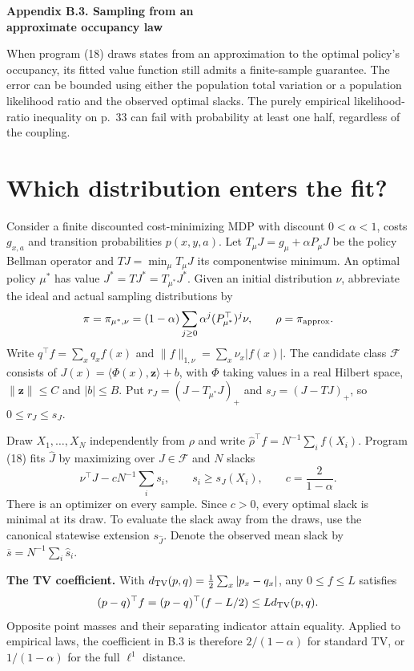 \documentclass[12pt,a4paper]{article}
\newcommand{\cF}{\mathcal F}
\newcommand{\TV}{d_{\rm TV}}
\newcommand{\al}{\alpha}
\newcommand{\app}{\pi_{\rm approx}}
\newcommand{\pistar}{\pi_{\mu^*,\nu}}
\newcommand{\lead}[1]{\par\smallskip\noindent\textbf{#1}\enspace}
\begin{document}
{\LARGE\bfseries Appendix B.3. Sampling from an\\[2pt] approximate occupancy law\par}
\medskip
When program (18) draws states from an approximation to the optimal policy's
occupancy, its fitted value function still admits a finite-sample guarantee.
The error can be bounded using either the population total variation or a
population likelihood ratio and the observed optimal slacks. The purely
empirical likelihood-ratio inequality on p.~33 can fail with probability at
least one half, regardless of the coupling.

\section*{Which distribution enters the fit?}
Consider a finite discounted cost-minimizing MDP with discount
$0<\al<1$, costs $g_{x,a}$ and transition probabilities $p(x,y,a)$. Let
$T_\mu J=g_\mu+\al P_\mu J$ be the policy Bellman operator and
$TJ=\min_\mu T_\mu J$ its componentwise minimum. An optimal policy
$\mu^*$ has value $J^*=TJ^*=T_{\mu^*}J^*$. Given an initial distribution
$\nu$, abbreviate the ideal and actual sampling distributions by
\[
 \pi=\pistar=(1-\al)\sum_{j\ge0}\al^j(P_{\mu^*}^{\top})^j\nu,
 \qquad \rho=\app .
\]
Write $q^\top f=\sum_x q_x f(x)$ and
$\|f\|_{1,\nu}=\sum_x\nu_x|f(x)|$. The candidate class $\cF$ consists of
$J(x)=\langle\Phi(x),\mathbf z\rangle+b$, with $\Phi$ taking values in a
real Hilbert space, $\|\mathbf z\|\le C$ and $|b|\le B$.
Put $r_J=(J-T_{\mu^*}J)_+$ and $s_J=(J-TJ)_+$, so $0\le r_J\le s_J$.

Draw $X_1,\ldots,X_N$ independently from $\rho$ and write
$\widehat\rho^\top f=N^{-1}\sum_i f(X_i)$. Program (18) fits $\widehat J$
by maximizing over $J\in\cF$ and $N$ slacks
\[
 \nu^\top J-cN^{-1}\sum_i s_i,\qquad
 s_i\ge s_J(X_i),\qquad c=\frac{2}{1-\al}.
\]
There is an optimizer on every sample. Since $c>0$, every optimal slack
is minimal at its draw. To evaluate the slack away from the draws, use the
canonical statewise extension $s_{\widehat J}$. Denote the observed mean
slack by $\overline s=N^{-1}\sum_i\widehat s_i$.

\lead{The TV coefficient.}
With $\TV(p,q)=\frac12\sum_x|p_x-q_x|$, any $0\le f\le L$ satisfies
\begin{equation}
 (p-q)^\top f=(p-q)^\top(f-L/2)\le L\TV(p,q).
 \label{eq:tv}
\end{equation}
Opposite point masses and their separating indicator attain equality.
Applied to empirical laws, the coefficient in B.3 is therefore
$2/(1-\al)$ for standard TV, or $1/(1-\al)$ for the full $\ell^1$ distance.
\end{document}
